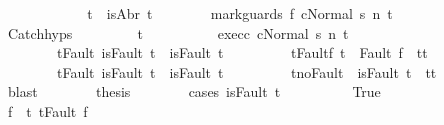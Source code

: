 \begin{isabellebody}
\ \ \ \ \isamarkupfalse%
\isanewline
\ \ \ \ \ \ \isamarkupfalse%
\ t{\isacharcolon}\ {\isachardoublequoteopen}{\isasymnot}\ isAbr\ t{\isachardoublequoteclose}\isanewline
\ \ \ \ \ \ \isamarkupfalse%
\ {\isachardoublequoteopen}{\isasymGamma}{\isasymturnstile}{\isasymlangle}mark{\isacharunderscore}guards\ f\ c{}{\isacharcomma}Normal\ s{\isacharprime}{\isasymrangle}\ {\isacharequal}n{\isasymRightarrow}\ t{\isachardoublequoteclose}\isanewline
\ \ \ \ \ \ \isamarkupfalse%
\ Catch{\isachardot}hyps\ \isanewline
\ \ \ \ \ \ \isamarkupfalse%
\ t{\isacharprime}\ \ \isanewline
\ \ \ \ \ \ \ \ exec{\isacharunderscore}c{}{\isacharcolon}\ {\isachardoublequoteopen}{\isasymGamma}{\isasymturnstile}{\isasymlangle}c{}{\isacharcomma}Normal\ s{\isacharprime}{\isasymrangle}\ {\isacharequal}n{\isasymRightarrow}\ t{\isacharprime}{\isachardoublequoteclose}\ \ \isanewline
\ \ \ \ \ \ \ \ t{\isacharunderscore}Fault{\isacharcolon}\ {\isachardoublequoteopen}isFault\ t\ {\isasymlongrightarrow}\ isFault\ t{\isacharprime}{\isachardoublequoteclose}\ \isanewline
\ \ \ \ \ \ \ \ t{\isacharprime}{\isacharunderscore}Fault{\isacharunderscore}f{\isacharcolon}\ {\isachardoublequoteopen}t{\isacharprime}\ {\isacharequal}\ Fault\ f\ {\isasymlongrightarrow}\ t{\isacharprime}{\isacharequal}t{\isachardoublequoteclose}\ \isanewline
\ \ \ \ \ \ \ \ t{\isacharprime}{\isacharunderscore}Fault{\isacharcolon}\ {\isachardoublequoteopen}isFault\ t{\isacharprime}\ {\isasymlongrightarrow}\ isFault\ t{\isachardoublequoteclose}\ \isanewline
\ \ \ \ \ \ \ \ t{\isacharprime}{\isacharunderscore}noFault{\isacharcolon}\ {\isachardoublequoteopen}{\isasymnot}\ isFault\ t{\isacharprime}\ {\isasymlongrightarrow}\ t{\isacharprime}{\isacharequal}t{\isachardoublequoteclose}\isanewline
\ \ \ \ \ \ \ \ \isamarkupfalse%
\ blast\isanewline
\ \ \ \ \ \ \isamarkupfalse%
\ {\isacharquery}thesis\isanewline
\ \ \ \ \ \ \isamarkupfalse%
\ {\isacharparenleft}cases\ {\isachardoublequoteopen}isFault\ t{\isacharprime}{\isachardoublequoteclose}{\isacharparenright}\isanewline
\ \ \ \ \ \ \ \ \isamarkupfalse%
\ True\isanewline
\ \ \ \ \ \ \ \ \isamarkupfalse%
\ \isamarkupfalse%
\ f{\isacharprime}\ \ t{\isacharprime}{\isacharcolon}\ {\isachardoublequoteopen}t{\isacharprime}{\isacharequal}Fault\ f{\isacharprime}{\isachardoublequoteclose}\isacommand{{\isachardot}{\isachardot}}\isamarkupfalse%

\end{isabellebody}
